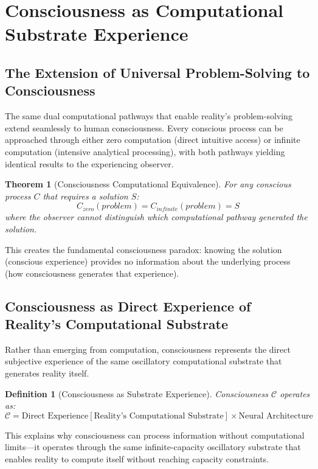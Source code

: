 \documentclass[12pt,a4paper]{article}
\newtheorem{theorem}{Theorem}
\newtheorem{definition}{Definition}
\begin{document}
\section{Consciousness as Computational Substrate Experience}

\subsection{The Extension of Universal Problem-Solving to Consciousness}

The same dual computational pathways that enable reality's problem-solving extend seamlessly to human consciousness. Every conscious process can be approached through either zero computation (direct intuitive access) or infinite computation (intensive analytical processing), with both pathways yielding identical results to the experiencing observer.

\begin{theorem}[Consciousness Computational Equivalence]
For any conscious process $C$ that requires a solution $S$:
$$C_{zero}(problem) = C_{infinite}(problem) = S$$
where the observer cannot distinguish which computational pathway generated the solution.
\end{theorem}

This creates the fundamental consciousness paradox: knowing the solution (conscious experience) provides no information about the underlying process (how consciousness generates that experience).

\subsection{Consciousness as Direct Experience of Reality's Computational Substrate}

Rather than emerging from computation, consciousness represents the direct subjective experience of the same oscillatory computational substrate that generates reality itself.

\begin{definition}[Consciousness as Substrate Experience]
Consciousness $\mathcal{C}$ operates as:
$$\mathcal{C} = \text{Direct Experience}[\text{Reality's Computational Substrate}] \times \text{Neural Architecture}$$
\end{definition}

This explains why consciousness can process information without computational limits—it operates through the same infinite-capacity oscillatory substrate that enables reality to compute itself without reaching capacity constraints.
\end{document}

